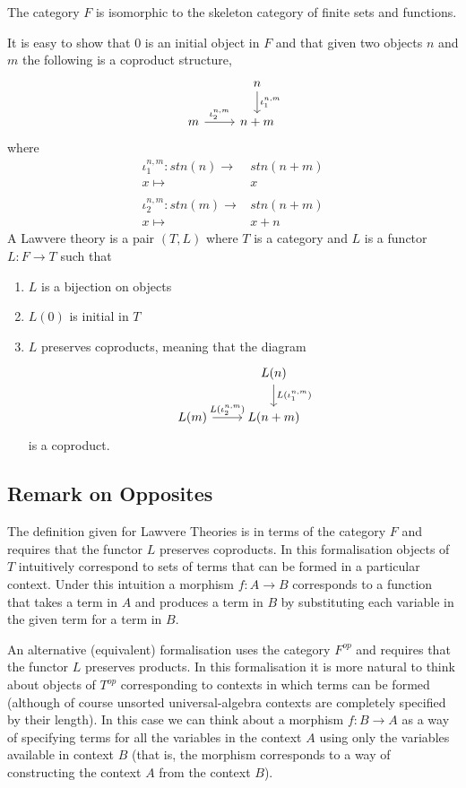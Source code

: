 The category $F$ is isomorphic to the skeleton category of finite sets and
functions.

It is easy to show that $0$ is an initial object in $F$ and that given two
objects $n$ and $m$ the following is a coproduct structure,
\[
\begin{tikzcd}
    & n\arrow[d, "\iota_1^{n,m}"] \\
    m\arrow[r, "\iota_2^{n,m}"] & n+m
\end{tikzcd}
\]
where
\begin{align*}
    \iota_1^{n,m}:stn(n)\to& stn(n+m) \\
    x\mapsto&x \\
    \\
    \iota_2^{n,m}:stn(m)\to& stn(n+m) \\
    x\mapsto&x+n
\end{align*}
A Lawvere theory\cite{Lawvere} is a pair $(T, L)$ where $T$ is a category and
$L$ is a functor $L : F \to T$ such that
\begin{enumerate}
    \item $L$ is a bijection on objects
    \item $L(0)$ is initial in $T$
    \item $L$ preserves coproducts, meaning that the diagram
    \[
    \begin{tikzcd}
        & L(n)\arrow[d, "L(\iota_1^{n,m})"] \\
        L(m)\arrow[r, "L(\iota_2^{n,m})"] & L(n+m)
    \end{tikzcd}
    \]
    is a coproduct.
\end{enumerate}

\subsection{Remark on Opposites}
The definition given for Lawvere Theories is in terms of the category $F$ and
requires that the functor $L$ preserves coproducts. In this formalisation
objects of $T$ intuitively correspond to sets of terms that can be formed in a
particular context. Under this intuition a morphism $f:A\to B$ corresponds to a
function that takes a term in $A$ and produces a term in $B$ by substituting
each variable in the given term for a term in $B$.

An alternative (equivalent) formalisation uses the category $F^{op}$ and
requires that the functor $L$ preserves products. In this formalisation it
is more natural to think about objects of $T^{op}$ corresponding to contexts in
which terms can be formed (although of course unsorted universal-algebra
contexts are completely specified by their length). In this case we can think
about a morphism $f:B\to A$ as a way of specifying terms for all the variables
in the context $A$ using only the variables available in context $B$ (that is,
the morphism corresponds to a way of constructing the context $A$ from the
context $B$). 


